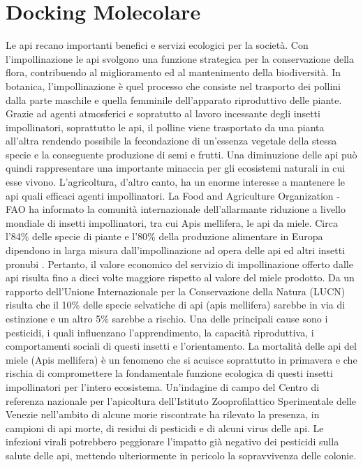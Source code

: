 \chapter{Docking Molecolare}
Le api recano importanti benefici e servizi ecologici per la società. Con l’impollinazione le api svolgono una funzione strategica per la conservazione della flora, contribuendo al miglioramento ed al mantenimento della biodiversità.\newline 
In botanica, l’impollinazione è quel processo che consiste nel trasporto dei pollini dalla parte maschile e quella femminile dell’apparato riproduttivo delle piante. Grazie ad agenti atmosferici e sopratutto al lavoro incessante degli insetti impollinatori, soprattutto le api, il polline viene trasportato da una pianta all’altra rendendo possibile la fecondazione di un’essenza vegetale della stessa specie e la conseguente produzione di semi e frutti. Una diminuzione delle api può quindi rappresentare una importante minaccia per gli ecosistemi naturali in cui esse vivono. L’agricoltura, d’altro canto, ha un enorme interesse a mantenere le api quali efficaci agenti impollinatori. La Food and Agriculture Organization - FAO ha informato la comunità internazionale dell’allarmante riduzione a livello mondiale di insetti impollinatori, tra cui Apis mellifera, le api da miele. Circa l’84\% delle specie di piante e l’80\% della produzione alimentare in Europa dipendono in larga misura dall’impollinazione ad opera delle api ed altri insetti pronubi \cite{bellucciapi}. Pertanto, il valore economico del servizio di impollinazione offerto dalle api risulta fino a dieci volte maggiore rispetto al valore del miele prodotto.\newline 
Da un rapporto dell’Unione Internazionale per la Conservazione della Natura (LUCN) risulta che il 10\% delle specie selvatiche di api (apis mellifera) sarebbe in via di estinzione e un altro 5\% sarebbe a rischio. Una delle principali cause sono i pesticidi, i quali influenzano l’apprendimento, la capacità riproduttiva, i comportamenti sociali di questi insetti e l'orientamento. \newline
La mortalità delle api del miele (Apis mellifera) è un fenomeno che si acuisce soprattutto in primavera e che rischia di compromettere la fondamentale funzione ecologica di questi insetti impollinatori per l’intero ecosistema.\newline
Un’indagine di campo del Centro di referenza nazionale per l’apicoltura dell’Istituto Zooprofilattico Sperimentale delle Venezie nell’ambito di alcune morie riscontrate ha rilevato la presenza, in campioni di api morte, di residui di pesticidi e di alcuni virus delle api. Le infezioni virali potrebbero peggiorare l’impatto già negativo dei pesticidi sulla salute delle api, mettendo ulteriormente in pericolo la sopravvivenza delle colonie.\newline
